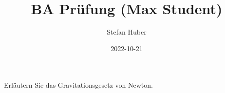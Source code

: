\documentclass[exam,nostudentinfo,nogradeinfo,german]{exsheet2}
\title{BA Prüfung (Max Student)}
\date{2022-10-21}
\author{Stefan Huber}
\institute{Department IT}
\begin{document}
\maketitle


\begin{exercise}
  Erläutern Sie das Gravitationsgesetz von Newton.
\end{exercise}
\end{document}
